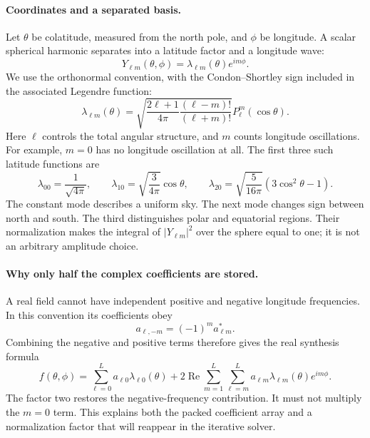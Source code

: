\paragraph{Coordinates and a separated basis.}
Let $\theta$ be colatitude, measured from the north pole, and $\phi$ be
longitude. A scalar spherical harmonic separates into a latitude factor
and a longitude wave:
\begin{equation}
 Y_{\ell m}(\theta,\phi)=\lambda_{\ell m}(\theta)e^{im\phi}.
\end{equation}
We use the orthonormal convention, with the Condon--Shortley sign included
in the associated Legendre function:
\begin{equation}
 \lambda_{\ell m}(\theta)=
 \sqrt{\frac{2\ell+1}{4\pi}\frac{(\ell-m)!}{(\ell+m)!}}
 P_\ell^m(\cos\theta).
\end{equation}
Here $\ell$ controls the total angular structure, and $m$ counts longitude
oscillations. For example, $m=0$ has no longitude oscillation at all.
The first three such latitude functions are
\begin{equation}
 \lambda_{00}=\frac{1}{\sqrt{4\pi}},\qquad
 \lambda_{10}=\sqrt{\frac{3}{4\pi}}\cos\theta,\qquad
 \lambda_{20}=\sqrt{\frac{5}{16\pi}}(3\cos^2\theta-1).
\end{equation}
The constant mode describes a uniform sky. The next mode changes sign
between north and south. The third distinguishes polar and equatorial
regions. Their normalization makes the integral of $|Y_{\ell m}|^2$ over
the sphere equal to one; it is not an arbitrary amplitude choice.

\paragraph{Why only half the complex coefficients are stored.}
A real field cannot have independent positive and negative longitude
frequencies. In this convention its coefficients obey
\begin{equation}
 a_{\ell,-m}=(-1)^m a_{\ell m}^{*}.
\end{equation}
Combining the negative and positive terms therefore gives the real synthesis
formula
\begin{equation}
 f(\theta,\phi)=\sum_{\ell=0}^{L}a_{\ell0}\lambda_{\ell0}(\theta)
 +2\operatorname{Re}\sum_{m=1}^{L}\sum_{\ell=m}^{L}
 a_{\ell m}\lambda_{\ell m}(\theta)e^{im\phi}.
\label{eq:real-synthesis}
\end{equation}
The factor two restores the negative-frequency contribution. It must not
multiply the $m=0$ term. This explains both the packed coefficient array
and a normalization factor that will reappear in the iterative solver.

